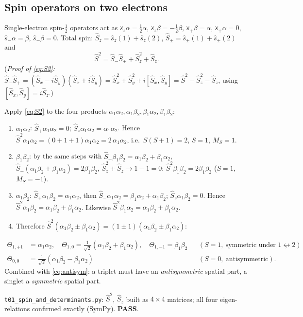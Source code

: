 \subsection{Spin operators on two electrons}
Single-electron spin-$\tfrac12$ operators act as
$\hat s_z\alpha=\tfrac12\alpha$, $\hat s_z\beta=-\tfrac12\beta$, $\hat s_+\beta=\alpha$, $\hat s_+\alpha=0$,
$\hat s_-\alpha=\beta$, $\hat s_-\beta=0$.
Total spin: $\hat S_z=\hat s_z(1)+\hat s_z(2)$, $\hat S_\pm=\hat s_\pm(1)+\hat s_\pm(2)$ and
\begin{equation}\label{eq:S2}
  \hat S^2=\hat S_-\hat S_++\hat S_z^2+\hat S_z .
\end{equation}
(\emph{Proof of \cref{eq:S2}:} $\hat S_-\hat S_+=(\hat S_x-i\hat S_y)(\hat S_x+i\hat S_y)
=\hat S_x^2+\hat S_y^2+i[\hat S_x,\hat S_y]=\hat S^2-\hat S_z^2-\hat S_z$, using $[\hat S_x,\hat S_y]=i\hat S_z$.)

Apply \cref{eq:S2} to the four products $\alpha_1\alpha_2,\alpha_1\beta_2,\beta_1\alpha_2,\beta_1\beta_2$:
\begin{enumerate}
  \item $\alpha_1\alpha_2$: $\hat S_+\alpha_1\alpha_2=0$; $\hat S_z\alpha_1\alpha_2=\alpha_1\alpha_2$.
        Hence $\hat S^2\alpha_1\alpha_2=(0+1+1)\alpha_1\alpha_2=2\,\alpha_1\alpha_2$, i.e.\ $S(S+1)=2$, $S=1$, $M_S=1$.
  \item $\beta_1\beta_2$: by the same steps with $\hat S_+\beta_1\beta_2=\alpha_1\beta_2+\beta_1\alpha_2$,
        $\hat S_-(\alpha_1\beta_2+\beta_1\alpha_2)=2\beta_1\beta_2$, $\hat S_z^2+\hat S_z\to 1-1=0$:
        $\hat S^2\beta_1\beta_2=2\beta_1\beta_2$ ($S=1$, $M_S=-1$).
  \item $\alpha_1\beta_2$: $\hat S_+\alpha_1\beta_2=\alpha_1\alpha_2$, then $\hat S_-\alpha_1\alpha_2=\beta_1\alpha_2+\alpha_1\beta_2$;
        $\hat S_z\alpha_1\beta_2=0$. Hence $\hat S^2\alpha_1\beta_2=\alpha_1\beta_2+\beta_1\alpha_2$.
        Likewise $\hat S^2\beta_1\alpha_2=\alpha_1\beta_2+\beta_1\alpha_2$.
  \item Therefore $\hat S^2(\alpha_1\beta_2\pm\beta_1\alpha_2)=(1\pm1)(\alpha_1\beta_2\pm\beta_1\alpha_2)$:
\end{enumerate}
\begin{resultbox}
\vspace{-1.2em}
\begin{align}
  \Theta_{1,+1}&=\alpha_1\alpha_2,\quad
  \Theta_{1,0}=\tfrac1{\sqrt2}(\alpha_1\beta_2+\beta_1\alpha_2),\quad
  \Theta_{1,-1}=\beta_1\beta_2 &&(S=1,\ \text{symmetric under }1\leftrightarrow2),\label{eq:tripspin}\\
  \Theta_{0,0}&=\tfrac1{\sqrt2}(\alpha_1\beta_2-\beta_1\alpha_2) &&(S=0,\ \text{antisymmetric}).\label{eq:singspin}
\end{align}
Combined with \cref{eq:antisym}: a triplet must have an \emph{antisymmetric} spatial part, a singlet a
\emph{symmetric} spatial part.
\end{resultbox}
\begin{verifybox}
\texttt{t01\_spin\_and\_determinants.py}: $\hat S^2$, $\hat S_z$ built as $4\times4$ matrices; all four
eigen-relations confirmed exactly (SymPy). \textbf{PASS}.
\end{verifybox}
